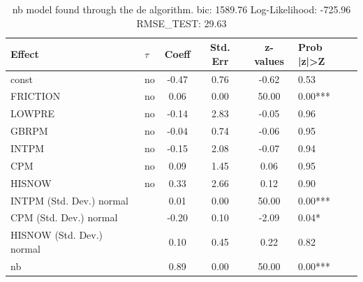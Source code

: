 \begin{table}
	\caption{nb model found through the de algorithm. bic: 1589.76 Log-Likelihood: -725.96 RMSE_TEST: 29.63}
	\begin{center}
		\begin{tabular}{|l|l|c|c|c|l|}
			\hline
			Effect & $\tau$ & Coeff & Std. Err & z-values & Prob |z|>Z \\
			\hline
			const & no & -0.47 & 0.76 & -0.62 & 0.53 \\
			\hline
			FRICTION & no & 0.06 & 0.00 & 50.00 & 0.00*** \\
			\hline
			LOWPRE & no & -0.14 & 2.83 & -0.05 & 0.96 \\
			\hline
			GBRPM & no & -0.04 & 0.74 & -0.06 & 0.95 \\
			\hline
			INTPM & no & -0.15 & 2.08 & -0.07 & 0.94 \\
			\hline
			CPM & no & 0.09 & 1.45 & 0.06 & 0.95 \\
			\hline
			HISNOW & no & 0.33 & 2.66 & 0.12 & 0.90 \\
			\hline
			INTPM (Std. Dev.) normal &  & 0.01 & 0.00 & 50.00 & 0.00*** \\
			\hline
			CPM (Std. Dev.) normal &  & -0.20 & 0.10 & -2.09 & 0.04* \\
			\hline
			HISNOW (Std. Dev.) normal &  & 0.10 & 0.45 & 0.22 & 0.82 \\
			\hline
			nb &  & 0.89 & 0.00 & 50.00 & 0.00*** \\
			\hline
		\end{tabular}
	\end{center}
\end{table}